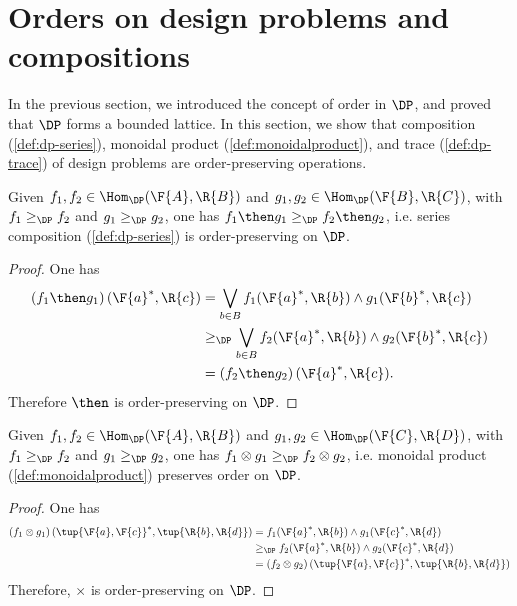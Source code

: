 \section{Orders on design problems and compositions}
In the previous section, we introduced the concept of order in $\DP$, and proved that $\DP$ forms a bounded lattice. In this section, we show that composition (\cref{def:dp-series}), monoidal product (\cref{def:monoidalproduct}), and trace (\cref{def:dp-trace}) of design problems are order-preserving operations.
\begin{lemma}
Given $f_1,f_2 \in \Hom_\DP(\F{A},\R{B})$ and $g_1,g_2 \in \Hom_\DP(\F{B},\R{C})$, with $f_1\geq_\DP f_2$ and $g_1\geq_\DP g_2$, one has $f_1\then g_1 \geq_\DP f_2\then g_2$, i.e. series composition (\cref{def:dp-series}) is order-preserving on $\DP$.
\end{lemma}

\begin{proof}
One has
\begin{equation}
    \begin{aligned}
    \left( f_1\then g_1\right)(\F{a}^*,\R{c})&=\bigvee_{b\in B}f_1(\F{a}^*,\R{b})\wedge g_1(\F{b}^*,\R{c})\\
    &\geq_\DP \bigvee_{b\in B} f_2(\F{a}^*,\R{b})\wedge g_2(\F{b}^*,\R{c})\\
    &=\left( f_2\then g_2\right)(\F{a}^*,\R{c}).
    \end{aligned}
\end{equation}
Therefore $\then$ is order-preserving on $\DP$.
\end{proof}

\begin{lemma}
Given $f_1,f_2 \in \Hom_\DP(\F{A},\R{B})$ and $g_1,g_2 \in \Hom_\DP(\F{C},\R{D})$, with $f_1\geq_\DP f_2$ and $g_1\geq_\DP g_2$, one has $f_1\otimes g_1 \geq_\DP f_2\otimes g_2$, i.e. monoidal product (\cref{def:monoidalproduct}) preserves order on $\DP$.
\end{lemma}

\begin{proof}
One has 
\begin{equation}
    \begin{aligned}
    \left( f_1\otimes g_1\right) (\tup{\F{a},\F{c}}^*,\tup{\R{b},\R{d}})&=f_1(\F{a}^*,\R{b})\wedge g_1(\F{c}^*,\R{d})\\
    &\geq_\DP f_2(\F{a}^*,\R{b})\wedge g_2(\F{c}^*,\R{d})\\
    &=\left( f_2\otimes g_2\right) (\tup{\F{a},\F{c}}^*,\tup{\R{b},\R{d}})
    \end{aligned}
\end{equation}
Therefore, $\times$ is order-preserving on $\DP$.
\end{proof}


